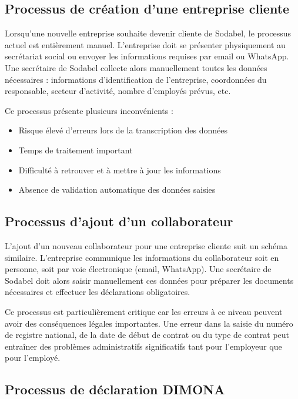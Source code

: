 \subsection{Processus de création d'une entreprise cliente}

Lorsqu'une nouvelle entreprise souhaite devenir cliente de Sodabel, le processus actuel est entièrement manuel. L'entreprise doit se présenter physiquement au secrétariat social ou envoyer les informations requises par email ou WhatsApp. Une secrétaire de Sodabel collecte alors manuellement toutes les données nécessaires : informations d'identification de l'entreprise, coordonnées du responsable, secteur d'activité, nombre d'employés prévus, etc.

\noindent Ce processus présente plusieurs inconvénients :
\begin{itemize}[leftmargin=*,label=\textcolor{darkgray}{$\bullet$},itemsep=0.3em]
  \item Risque élevé d'erreurs lors de la transcription des données
  \item Temps de traitement important
  \item Difficulté à retrouver et à mettre à jour les informations
  \item Absence de validation automatique des données saisies
\end{itemize}

\subsection{Processus d'ajout d'un collaborateur}

L'ajout d'un nouveau collaborateur pour une entreprise cliente suit un schéma similaire. L'entreprise communique les informations du collaborateur soit en personne, soit par voie électronique (email, WhatsApp). Une secrétaire de Sodabel doit alors saisir manuellement ces données pour préparer les documents nécessaires et effectuer les déclarations obligatoires.

\begin{note}
Ce processus est particulièrement critique car les erreurs à ce niveau peuvent avoir des conséquences légales importantes. Une erreur dans la saisie du numéro de registre national, de la date de début de contrat ou du type de contrat peut entraîner des problèmes administratifs significatifs tant pour l'employeur que pour l'employé.
\end{note}

\subsection{Processus de déclaration DIMONA}


